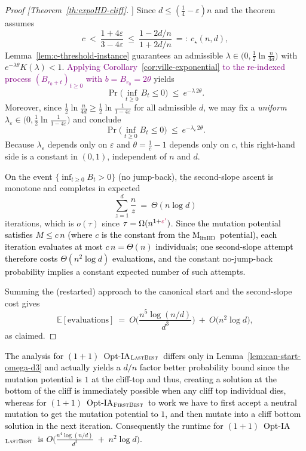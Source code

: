 \documentclass[lettersize,journal]{IEEEtran}
\newcommand{\rerev}[1]{\textcolor{purple}{#1}}
\newcommand{\EE}{\mathbb{E}}
\newcommand{\linHD}{M$_{\text{linHD}}$}
\newcommand{\firstBest}{$(1+1)$~Opt-IA$_{\textsc{FirstBest}}$}
\newcommand{\lastBest}{$(1+1)$~Opt-IA$_{\textsc{LastBest}}$}
\begin{document}
{\begin{proof}[Proof [Theorem~\ref{th:expoHD-cliff}]]
	Since $d\le(\tfrac14-\varepsilon)n$ and the theorem assumes
	\[
	c\ <\ \frac{1+4\varepsilon}{3-4\varepsilon}\ \le\ \frac{1-2d/n}{1+2d/n}\ =:\ c_\star(n,d),
	\]
	Lemma~\ref{lem:c-threshold-instance} guarantees an admissible $\lambda\in\big(0,\tfrac12\ln\tfrac{n}{4d}\big)$ with $e^{-\lambda\theta}K(\lambda)<1$.
	\rerev{Applying Corollary~\ref{cor:ville-exponential} to the re-indexed process $(B_{r_0+t})_{t\ge0}$ with $b=B_{r_0}=2\theta$} yields
	\[
	\Pr\!\Big(\inf_{t\ge 0} B_t\le 0\Big)\ \le\ e^{-\lambda\,2\theta}.
	\]
	Moreover, since $\tfrac12\ln\!\tfrac{n}{4d}\ge \tfrac12\ln\!\tfrac{1}{1-4\varepsilon}$ for all admissible $d$, we may fix a \emph{uniform} $\lambda_\varepsilon\in\big(0,\tfrac12\ln\tfrac{1}{1-4\varepsilon}\big)$ and conclude
	\[
	\Pr\!\Big(\inf_{t\ge 0} B_t\le 0\Big)\ \le\ e^{-\lambda_\varepsilon\,2\theta}.
	\]
	Because $\lambda_\varepsilon$ depends only on $\varepsilon$ and $\theta=\tfrac1c-1$ depends only on $c$, this right-hand side is a constant in $(0,1)$, independent of $n$ and $d$.
	
	\smallskip
	On the event $\{\inf_{t\ge 0} B_t>0\}$ (no jump-back), the second-slope ascent is monotone and completes in expected
	\[
	\sum_{z=1}^{d}\frac{n}{z}\ =\ \Theta(n\log d)
	\]
	iterations, which is $o(\tau)$ since $\tau=\Omega(n^{1+\rerev{\varepsilon'}})$. \textcolor{black}{Since the mutation potential satisfies $M \le c\,n$ (where $c$ is the constant
		from the \linHD\ potential), each iteration evaluates at most $c\,n =\Theta(n)$
		individuals; one second-slope attempt therefore costs $\Theta(n^{2}\log d)$
		evaluations,} and the constant no-jump-back probability implies a constant expected number of such attempts.
	
	\smallskip
	
	Summing the (restarted) approach to the canonical start and the second-slope cost gives
	\[
	\EE[\text{evaluations}]
	\ =\ O\!\Big(\frac{n^{5}\log(n/d)}{d^{3}}\Big)\ +\ O\!\big(n^{2}\log d\big),
	\]
	as claimed.
\end{proof}



\textcolor{black}{The analysis for \lastBest~differs only in Lemma~\ref{lem:can-start-omega-d3} and actually yields a $d/n$ factor better probability bound since the mutation potential is $1$ at the cliff-top and thus, creating a solution at the bottom of the cliff is immediately possible when any cliff top individual dies, whereas for \firstBest~to work we have to first accept a neutral mutation to get the mutation potential to $1$, and then mutate into a cliff bottom solution in the next iteration. Consequently the runtime for \lastBest~is  
$O\!\Big(\frac{n^{4}\log(n/d)}{d^{2}} \;+\; n^{2}\log d\Big)$.}

}
\end{document}
